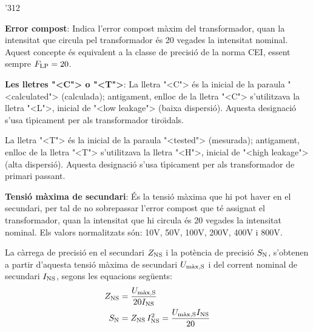 \begin{dingautolist}{'312}
    \item \textbf{Error compost}: Indica l'error compost m\`{a}xim del
    transformador, quan la intensitat que circula pel
    transformador \'{e}s 20 vegades la intensitat nominal. Aquest concepte
     \'{e}s equivalent a la classe de precisi\'{o} de la norma \textsf{CEI},
     essent sempre $F_\mathrm{LP}=20$.
    \item \textbf{Les lletres {"<}C{">} o {"<}T{">}}: La lletra {"<}C{">} \'{e}s la inicial de la
    paraula  {"<}calculated{">} (calculada); antigament, enlloc de la lletra {"<}C{">}
    s'utilitzava la lletra {"<}L{">}, inicial de {"<}low leakage{">} (baixa
    dispersi\'{o}). Aquesta designaci\'{o} s'usa t\'{\i}picament per als
    transformador tiro\"{\i}dals.

    La lletra {"<}T{">} \'{e}s la inicial de la
    paraula  {"<}tested{">} (mesurada); antigament, enlloc de la lletra {"<}T{">}
    s'utilitzava la lletra {"<}H{">}, inicial de {"<}high leakage{">} (alta
    dispersi\'{o}). Aquesta designaci\'{o} s'usa t\'{\i}picament per als
    transformador de primari passant.
    \item \textbf{Tensi\'{o} m\`{a}xima de secundari}: \'{E}s la tensi\'{o} m\`{a}xima
    que hi pot haver en el secundari, per tal de no sobrepassar l'error compost que t\'{e}
    assignat el transformador, quan la intensitat que hi circula
     \'{e}s 20 vegades la intensitat nominal. Els valors
    normalitzats s\'{o}n: 10\unit{V}, 50\unit{V}, 100\unit{V}, 200\unit{V}, 400\unit{V} i 800\unit{V}.

    La c\`{a}rrega de precisi\'{o} en el secundari
    $Z_\mathrm{NS}$ i la pot\`{e}ncia de precisi\'{o} $S_\mathrm{N}$, s'obtenen a partir d'aquesta
    tensi\'{o} m\`{a}xima de secundari $U_\mathrm{m\grave{a}x,S}$
    i del corrent     nominal de secundari $I_\mathrm{NS}$, segons les equacions seg\"{u}ents:
    \begin{align}
        Z_\mathrm{NS} &= \frac{U_\mathrm{m\grave{a}x,S}}{20 I_\mathrm{NS}}\\
        S_\mathrm{N} &= Z_\mathrm{NS} \,I_\mathrm{NS}^2 = \frac{U_\mathrm{m\grave{a}x,S} I_\mathrm{NS}}{20}
        \label{eq:sn_ti_ieee}
    \end{align}
\end{dingautolist}

